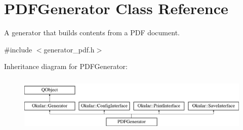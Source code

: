 \hypertarget{classPDFGenerator}{\section{P\+D\+F\+Generator Class Reference}
\label{classPDFGenerator}
}


A generator that builds contents from a P\+D\+F document.  




{\ttfamily \#include $<$generator\+\_\+pdf.\+h$>$}

Inheritance diagram for P\+D\+F\+Generator\+:\begin{figure}[H]
\begin{center}
\leavevmode
\includegraphics[height=2.781457cm]{classPDFGenerator}
\end{center}
\end{figure}
